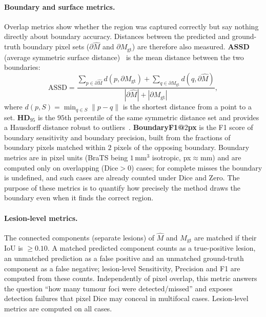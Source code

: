 \documentclass[11pt,a4paper]{article}
\begin{document}
\paragraph{Boundary and surface metrics.} Overlap metrics show whether the region
was captured correctly but say nothing directly about boundary accuracy. Distances
between the predicted and ground-truth boundary pixel sets ($\partial\hat M$ and
$\partial M_{\mathrm{gt}}$) are therefore also measured. \textbf{ASSD} (average
symmetric surface distance)~\cite{taha2015} is the mean distance between the two
boundaries:
\begin{equation}
\mathrm{ASSD}=\frac{\sum_{p\in\partial\hat M} d(p,\partial M_{\mathrm{gt}})
+\sum_{q\in\partial M_{\mathrm{gt}}} d(q,\partial\hat M)}
{|\partial\hat M|+|\partial M_{\mathrm{gt}}|},
\label{eq:assd}
\end{equation}
where $d(p,S)=\min_{q\in S}\lVert p-q\rVert$ is the shortest distance from a point
to a set. \textbf{HD$_{95}$} is the $95$th percentile of the same symmetric
distance set and provides a Hausdorff distance robust to
outliers~\cite{taha2015}. \textbf{BoundaryF1@$2$px} is the F1 score of boundary
sensitivity and boundary precision, built from the fractions of boundary pixels
matched within $2$ pixels of the opposing boundary. Boundary metrics are in pixel
units (BraTS being $1\,\text{mm}^3$ isotropic, px$\approx$mm) and are computed
only on overlapping (Dice$>0$) cases; for complete misses the boundary is
undefined, and such cases are already counted under Dice and Zero. The purpose of
these metrics is to quantify how precisely the method draws the boundary even when
it finds the correct region.

\paragraph{Lesion-level metrics.} The connected components (separate lesions) of
$\hat M$ and $M_{\mathrm{gt}}$ are matched if their IoU is $\ge 0.10$. A matched
predicted component counts as a true-positive lesion, an unmatched prediction as a
false positive and an unmatched ground-truth component as a false negative;
lesion-level Sensitivity, Precision and F1 are computed from these counts.
Independently of pixel overlap, this metric answers the question ``how many tumour
foci were detected/missed'' and exposes detection failures that pixel Dice may
conceal in multifocal cases. Lesion-level metrics are computed on all cases.
\end{document}
